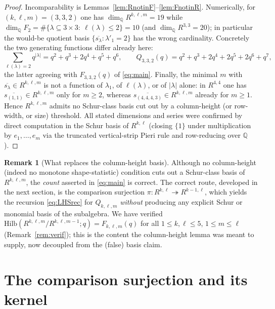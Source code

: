 \documentclass{amsart}
\theoremstyle{definition}
\newtheorem{remark}{Remark}
\newcommand{\Hilb}{\mathrm{Hilb}}
\newcommand{\Q}{\mathbb{Q}}
\newcommand{\rkl}{R^{k,\ell}}
\newcommand{\Rklm}{R^{k,\ell,m}}
\begin{document}
\begin{proof}
Incomparability is Lemmas~\ref{lem:RnotinF}--\ref{lem:FnotinR}. Numerically, for
$(k,\ell,m)=(3,3,2)$ one has $\dim_\Q\Rklm=19$ while
$\dim_\Q F_2=\#\{\lambda\subseteq3\times3:\ \ell(\lambda)\le2\}=10$ (and
$\dim_\Q R^{3,3}=20$); in particular the would-be quotient basis
$\{\overline{s_\lambda}:\lambda'_1=2\}$ has the wrong cardinality. Concretely the two
generating functions differ already here:
\[
\sum_{\ell(\lambda)=2}q^{|\lambda|}=q^2+q^3+2q^4+q^5+q^6,
\qquad
Q_{3,3,2}(q)=q^2+q^3+2q^4+2q^5+2q^6+q^7 ,
\]
the latter agreeing with $F_{3,3,2}(q)$ of \eqref{eq:main}. Finally, the minimal
$m$ with $\overline{s_\lambda}\in\Rklm$ is not a function of $\lambda_1$, of
$\ell(\lambda)$, or of $|\lambda|$ alone: in $R^{4,4}$ one has
$\overline{s_{(1,1)}}\in\Rklm$ only for $m\ge2$, whereas
$\overline{s_{(4,4,4,3)}}\in\Rklm$ already for $m\ge1$. Hence $\Rklm$ admits no
Schur-class basis cut out by a column-height (or row-width, or size) threshold.
All stated dimensions and series were confirmed by direct computation in the Schur
basis of $\rkl$ (closing $\{1\}$ under multiplication by $e_1,\dots,e_m$ via the
truncated vertical-strip Pieri rule and row-reducing over $\Q$).
\end{proof}

\begin{remark}[What replaces the column-height basis]\label{rem:replacement}
Although no column-height (indeed no monotone shape-statistic) condition cuts out a
Schur-class basis of $\Rklm$, the \emph{count} asserted in \eqref{eq:main} is correct.
The correct route, developed in the next section, is the comparison surjection
$\pi\colon\rkl\twoheadrightarrow R^{k-1,\ell}$, which yields the recursion
\eqref{eq:LHSrec} for $Q_{k,\ell,m}$ \emph{without} producing any explicit Schur or
monomial basis of the subalgebra. We have verified
$\Hilb(\Rklm/R^{k,\ell,m-1};q)=F_{k,\ell,m}(q)$ for all $1\le k,\ell\le5$,
$1\le m\le\ell$ (Remark~\ref{rem:verif}); this is the content the column-height
lemma was meant to supply, now decoupled from the (false) basis claim.
\end{remark}

\section{The comparison surjection and its kernel}
\end{document}

